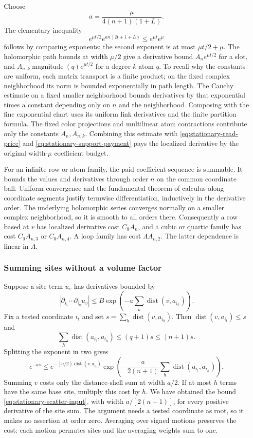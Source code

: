 Choose
\[
                         a=\frac\mu{4(n+1)(1+L)}.
\]
The elementary inequality
\begin{equation}\label{eq:stationary-support-payment}
         e^{\mu t/2}e^{an(2t+1+L)}\le e^{\mu t}e^\mu
\end{equation}
follows by comparing exponents: the second exponent is at most
$\mu t/2+\mu$.
The holomorphic path bounds at width $\mu/2$ give a derivative
bound $A_n e^{\mu t/2}$ for a slot, and
$A_{n,k}\operatorname{magnitude}(q)e^{\mu t/2}$ for a degree-$k$
atom $q$. To recall why the constants are uniform, each matrix
transport is a finite product; on the fixed complex neighborhood
its norm is bounded exponentially in path length. The Cauchy
estimate on a fixed smaller neighborhood bounds derivatives by
that exponential times a constant depending only on $n$ and the
neighborhood. Composing with the fine exponential chart uses its
uniform link derivatives and the finite partition formula. The
fixed color projections and multilinear atom contractions contribute
only the constants $A_n,A_{n,k}$.
Combining this estimate with
\eqref{eq:stationary-read-price} and
\eqref{eq:stationary-support-payment} pays the localized derivative
by the original width-$\mu$ coefficient budget.

For an infinite row or atom family, the paid coefficient sequence
is summable. It bounds the values and derivatives through order
$n$ on the common coordinate ball. Uniform convergence and the
fundamental theorem of calculus along coordinate segments justify
termwise differentiation, inductively in the derivative order.
The underlying holomorphic series converges normally on a smaller
complex neighborhood, so it is smooth to all orders there.
Consequently a row based at $v$ has localized derivative cost
$C_0A_n$, and a cubic or quartic family has cost $C_0A_{n,3}$ or
$C_0A_{n,4}$. A loop family has cost $\Lambda A_{n,2}$.
The latter dependence is linear in $\Lambda$.

\subsubsection{Summing sites without a volume factor}
Suppose a site term $u_v$ has derivatives bounded by
\[
 |\partial_{i_1}\cdots\partial_{i_q}u_v|
             \le B\exp\!\left(-a\sum_h\operatorname{dist}(v,a_{i_h})\right).
\]
Fix a tested coordinate $i_t$ and set
$s=\sum_h\operatorname{dist}(v,a_{i_h})$. Then
$\operatorname{dist}(v,a_{i_t})\le s$ and
\[
 \sum_h\operatorname{dist}(a_{i_t},a_{i_h})
                                         \le(q+1)s\le(n+1)s.
\]
Splitting the exponent in two gives
\[
 e^{-as}\le e^{-(a/2)\operatorname{dist}(v,a_{i_t})}
     \exp\!\left(-\frac a{2(n+1)}
                     \sum_h\operatorname{dist}(a_{i_t},a_{i_h})\right).
\]
Summing $v$ costs only the distance-shell sum at width $a/2$.
If at most $h$ terms have the same base site, multiply this cost
by $h$. We have obtained the bound
\eqref{eq:stationary-scatter-input}, with width $a/[2(n+1)]$,
for every positive derivative of the site sum. The argument needs
a tested coordinate as root, so it makes no assertion at order
zero. Averaging over signed motions preserves the cost: each
motion permutes sites and the averaging weights sum to one.

